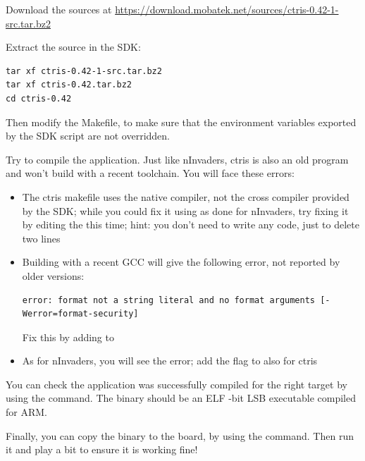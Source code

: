 Download the  sources at
\url{https://download.mobatek.net/sources/ctris-0.42-1-src.tar.bz2}

Extract the source in the SDK:
\begin{verbatim}
tar xf ctris-0.42-1-src.tar.bz2
tar xf ctris-0.42.tar.bz2
cd ctris-0.42
\end{verbatim}

Then modify the Makefile, to make sure that the environment variables exported
by the SDK script are not overridden.

Try to compile the application. Just like nInvaders, ctris is also an old
program and won't build with a recent toolchain. You will face these
errors:

\begin{itemize}
  \item The ctris makefile uses the native compiler, not the cross compiler
  provided by the SDK; while you could fix it using  as done
  for nInvaders, try fixing it by editing the  this time;
  hint: you don't need to write any code, just to delete two lines

  \item Building with a recent GCC will give the following error, not
  reported by older versions:
\begin{verbatim}
error: format not a string literal and no format arguments [-Werror=format-security]
\end{verbatim}
  Fix this by adding  to 

  \item As for nInvaders, you will see the 
  error; add the  flag to  also for ctris

\end{itemize}

You can check the application was successfully compiled for the right
target by using the  command.  The  binary should be
an ELF -bit LSB
executable compiled for ARM.

Finally, you can copy the binary to the board, by using the 
command. Then run it and play a bit to ensure it is working fine!
